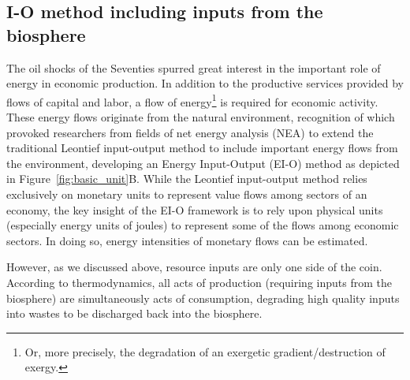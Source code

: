 \subsection{I-O method including inputs from the biosphere}
\label{sec:IO_resource}

The oil shocks of the Seventies spurred great interest in
the important role of energy in economic production.
In addition to the productive services 
provided by flows of capital and labor,
a flow of energy\footnote{Or, more precisely, 
the degradation of an exergetic gradient/destruction of exergy.} 
is required for economic activity. 
These energy flows originate from the natural environment, 
recognition of which provoked researchers from fields of 
net energy analysis (NEA) to extend 
the traditional Leontief
input-output method to include important 
energy flows from the environment, 
developing an Energy Input-Output (EI-O)
method as depicted in Figure~\ref{fig:basic_unit}B.\cite{Carter1974,
Bullard1975,Bullard1976a,Herendeen1978,Costanza:1980ww,
Casler1984,Joshi:1999uw,Suh2009}
While the Leontief input-output method
relies exclusively 
on monetary units to represent value flows 
among sectors of an economy, 
the key insight of the EI-O framework 
is to rely upon physical units 
(especially energy units of joules) 
to represent some of the flows among economic sectors. 
In doing so, 
energy intensities of monetary flows can be estimated. 

However,
as we discussed above,
resource inputs are only one side of the coin.
According to thermodynamics,
all acts of production (requiring inputs from the biosphere)
are simultaneously acts of consumption,
degrading high quality inputs into wastes to be 
discharged back into the biosphere.


